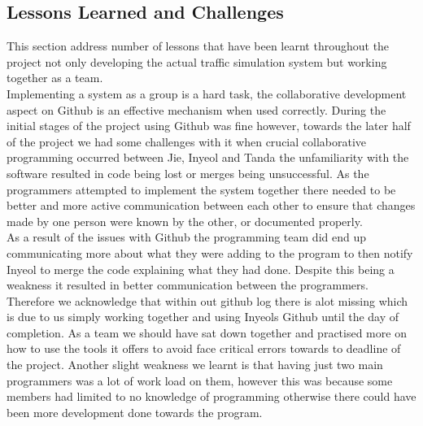 \documentclass[11pt]{article}
\begin{document}
\subsection{Lessons Learned and Challenges} 
This section address number of lessons that have been learnt throughout the project not only developing the actual traffic simulation system but working together as a team.\\
Implementing a system as a group is a hard task, the collaborative development aspect on Github is an effective mechanism when used correctly. During the initial stages of the project using Github was fine however, towards the later half of the project we had some challenges with it when crucial collaborative programming occurred between Jie, Inyeol and Tanda the unfamiliarity with the software resulted in code being lost or merges being unsuccessful. As the programmers attempted to implement the system together there needed to be better and more active communication between each other to ensure that changes made by one person were known by the other, or documented properly. 
\\As a result of the issues with Github the programming team did end up communicating more about what they were adding to the program to then notify Inyeol to merge the code explaining what they had done. Despite this being a weakness it resulted in better communication between the programmers. Therefore we acknowledge that within out github log there is alot missing which is due to us simply working together and using Inyeols Github until the day of completion.
As a team we should have sat down together and practised more on how to use the tools it offers to avoid face critical errors towards to deadline of the project. 
Another slight weakness we learnt is that having just two main programmers was a lot of work load on them, however this was because some members had limited to no knowledge of programming otherwise there could have been more development done towards the program.\\
\end{document}
